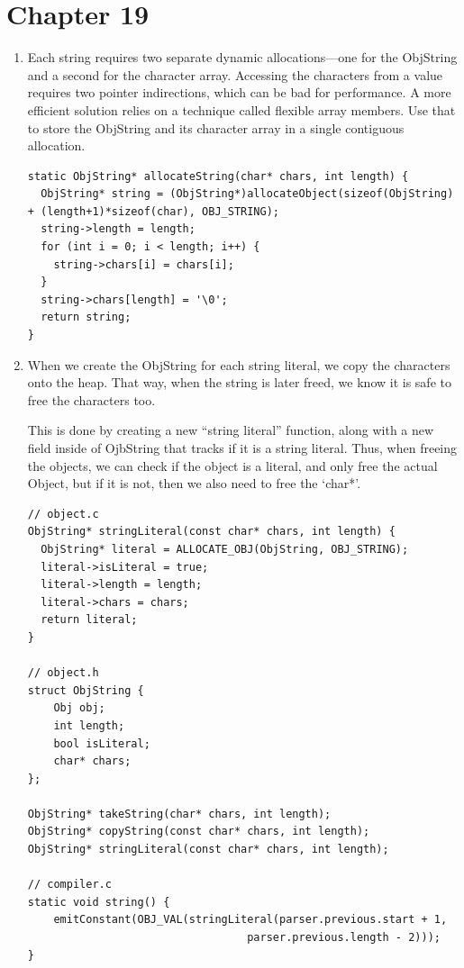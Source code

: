 \documentclass{article}
\begin{document}
\section*{Chapter 19}
\begin{enumerate}
    \item {
        Each string requires two separate dynamic allocations—one for the ObjString and a second for the character array. Accessing the characters from a value requires two pointer indirections, which can be bad for performance. A more efficient solution relies on a technique called flexible array members. Use that to store the ObjString and its character array in a single contiguous allocation.

        \begin{verbatim}
static ObjString* allocateString(char* chars, int length) {
  ObjString* string = (ObjString*)allocateObject(sizeof(ObjString) + (length+1)*sizeof(char), OBJ_STRING);
  string->length = length;
  for (int i = 0; i < length; i++) {
    string->chars[i] = chars[i];
  }
  string->chars[length] = '\0';
  return string;
}
        \end{verbatim}
    }

    \item {
        When we create the ObjString for each string literal, we copy the characters onto the heap. That way, when the string is later freed, we know it is safe to free the characters too.

        This is done by creating a new ``string literal'' function, along with a 
        new field inside of OjbString that tracks if it is a string literal. 
        Thus, when freeing the objects, we can check if the object is a literal, 
        and only free the actual Object, but if it is not, then we also need 
        to free the `char*'.
        \begin{verbatim}
// object.c
ObjString* stringLiteral(const char* chars, int length) {
  ObjString* literal = ALLOCATE_OBJ(ObjString, OBJ_STRING);
  literal->isLiteral = true;
  literal->length = length;
  literal->chars = chars;
  return literal;
}

// object.h 
struct ObjString {
    Obj obj;
    int length;
    bool isLiteral;
    char* chars;
};

ObjString* takeString(char* chars, int length);
ObjString* copyString(const char* chars, int length);
ObjString* stringLiteral(const char* chars, int length);

// compiler.c 
static void string() {
    emitConstant(OBJ_VAL(stringLiteral(parser.previous.start + 1,
                                  parser.previous.length - 2)));
}


\end{verbatim}}
\end{enumerate}
\end{document}
